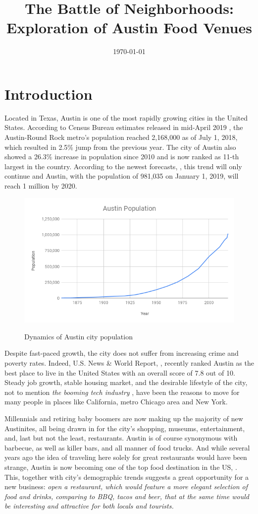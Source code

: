 \documentclass[11pt]{article}
\title{The Battle of Neighborhoods: Exploration of Austin Food Venues}
\date{\today}
\numberwithin{equation}{section}
\begin{document}
\maketitle

\section{Introduction}
	Located in Texas, Austin is one of the most rapidly growing cities in the United States. According to Census Bureau estimates released in mid-April 2019	 \cite{census}, the Austin-Round Rock metro's population reached 2,168,000 as of July 1, 2018, which resulted in 2.5\% jump from the previous year. The city of Austin also showed a 26.3\% increase in population since 2010 and is now ranked as 11-th largest in the country. According to the newest forecasts, \cite{culture_map}, this trend will only continue and Austin, with the population of 981,035 on January 1, 2019, will reach 1 million by 2020. 
\begin{figure}[ht!]
	\centering
	\includegraphics[width=.6\textwidth]{pics/austin_growth}
		\label{fig:1_1}
	\caption{Dynamics of Austin city population}
	\label{fig:4}
\end{figure}
	
	Despite fast-paced growth, the city does not suffer from increasing crime and poverty rates. Indeed,  U.S. News \& World Report, \cite{realestate}, recently ranked Austin as the best place to live in the United States with an overall score of 7.8 out of 10. Steady job growth, stable housing market, and the desirable lifestyle of the city, not to mention {\it the booming tech industry} , have been the reasons to move for many people in places like California, metro Chicago area and New York.
	
Millennials and retiring baby boomers are now making up the majority of new Austinites, all being drawn in for the city's shopping, museums, entertainment, and, last but not the least, restaurants. Austin is of course synonymous with barbecue, as well as killer bars, and all manner of food trucks. And while several years ago the idea of traveling here solely for great restaurants would have been strange, Austin is now becoming one of the top food destination in the US, \cite{zagat}. This, together with city's demographic trends suggests a great opportunity for a new business: {\it open a restaurant, which would feature a more elegant selection of food and drinks, comparing to BBQ, tacos and beer, that at the same time would be interesting and attractive for both locals and tourists.}
\end{document}
